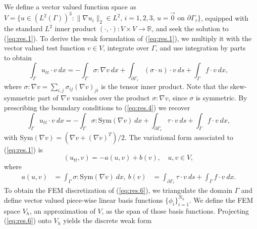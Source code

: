 We define a vector valued function space as $V = \{ u \in (L^2(\Gamma))^3 : \| \nabla u_i \|_2 \in L^2 \text{, } i=1,2,3\text{, } u = \vec 0 \text{ on } \partial \Gamma_\tau \}$, equipped with the standard $L^2$ inner product $(\cdot,\cdot):V\times V \to \mathbb R$, and seek the solution to (\ref{eq:res.1}). To derive the weak formulation of (\ref{eq:res.1}), we multiply it with the vector valued test function $v \in V$, integrate over $\Gamma$, and use integration by parts to obtain
\begin{equation}  \label{eq:res.4}
	\int_{\Gamma} u_{tt} \cdot v\ dx = - \int_{\Gamma} \sigma : \nabla v \ dx+ \int_{\partial \Gamma_\tau} (\sigma \cdot n) \cdot v\ ds +  \int_{\Gamma} f \cdot v \ dx,
\end{equation}
where $\sigma : \nabla v = \sum_{i,j}\sigma_{ij}(\nabla v)_{ji}$ is the tensor inner product. Note that the skew-symmetric part of $\nabla v$ vanishes over the product $\sigma : \nabla v$, since $\sigma$ is symmetric. By prescribing the boundary conditions to (\ref{eq:res.4}) we recover
\begin{equation} \label{eq:res.5}
	\int_{\Gamma} u_{tt} \cdot v\ dx = - \int_{\Gamma} \sigma : \text{Sym}(\nabla v) \ dx+ \int_{\partial \Gamma_\tau} \tau \cdot v\ ds +  \int_{\Gamma} f \cdot v \ dx,
\end{equation}
with Sym$(\nabla v) = (\nabla v + (\nabla v)^T)/2$. The variational form associated to (\ref{eq:res.1}) is
\begin{equation} \label{eq:res.6}
	(u_{tt},v) = - a(u,v) + b(v), \quad u,v\in V,
\end{equation}
where
\begin{equation} \label{eq:res.7}
\begin{aligned}
	a(u,v) &= \int_{\Gamma} \sigma : \text{Sym}(\nabla v) \ dx, ~
	b(v) &= \int_{\partial \Gamma_\tau} \tau \cdot v\ ds +  \int_{\Gamma} f \cdot v \ dx.
\end{aligned}
\end{equation}
To obtain the FEM discretization of (\ref{eq:res.6}), we triangulate the domain $\Gamma$ and define vector valued piece-wise linear basis functions $\{\phi_i\}_{i=1}^{N_h}$. We define the FEM space $V_h$, an approximation of $V$, as the span of those basis functions. Projecting (\ref{eq:res.6}) onto $V_h$ yields the discrete weak form
